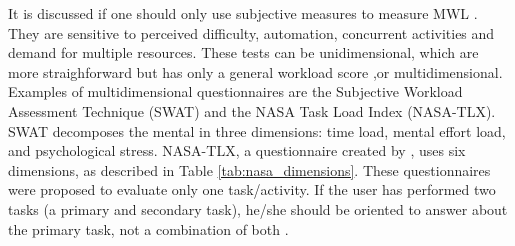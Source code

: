         It is discussed if one should only use subjective measures to measure MWL \cite{sanders1998human, stanton2004handbook}. They are sensitive to perceived difficulty, automation, concurrent activities and demand for multiple resources. These tests can be unidimensional, which are more straighforward but has only a general workload score \cite{stanton2004handbook},or multidimensional. Examples of multidimensional questionnaires are the Subjective Workload Assessment Technique (SWAT) and the NASA Task Load Index (NASA-TLX). SWAT decomposes the mental in three dimensions: time load, mental effort load, and psychological stress. NASA-TLX, a questionnaire created by , uses six dimensions, as described in Table \ref{tab:nasa_dimensions}. These questionnaires were proposed to evaluate only one task/activity. If the user has performed two tasks (a primary and secondary task), he/she should be oriented to answer about the primary task, not a combination of both \cite{sanders1998human}.
        
